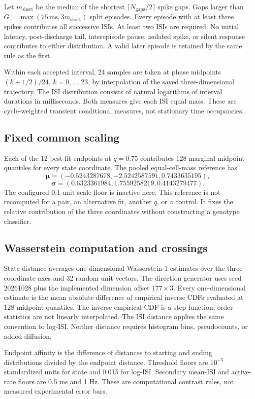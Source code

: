 \documentclass[11pt,a4paper]{article}
\begin{document}
Let $m_{\mathrm{short}}$ be the median of the shortest $\lceil N_{\mathrm{gaps}}/2\rceil$ spike gaps. Gaps larger than $G=\max(75\,\mathrm{ms},3m_{\mathrm{short}})$ split episodes. Every episode with at least three spikes contributes all successive ISIs. At least two ISIs are required. No initial latency, post-discharge tail, interepisode pause, isolated spike, or silent response contributes to either distribution. A valid later episode is retained by the same rule as the first.

Within each accepted interval, 24 samples are taken at phase midpoints $(k+1/2)/24$, $k=0,\ldots,23$, by interpolation of the saved three-dimensional trajectory. The ISI distribution consists of natural logarithms of interval durations in milliseconds. Both measures give each ISI equal mass. These are cycle-weighted transient conditional measures, not stationary time occupancies.

\subsection*{Fixed common scaling}
Each of the 12 best-fit endpoints at $q=0.75$ contributes 128 marginal midpoint quantiles for every state coordinate. The pooled equal-cell-mass reference has
\[\boldsymbol\mu=(-0.5243287678,-2.5242587591,0.7433635195),\]
\[\boldsymbol\sigma=(0.6323361984,1.7559258219,0.4143279477).\]
The configured 0.1-unit scale floor is inactive here. This reference is not recomputed for a pair, an alternative fit, another $q$, or a control. It fixes the relative contribution of the three coordinates without constructing a genotype classifier.

\subsection*{Wasserstein computation and crossings}
State distance averages one-dimensional Wasserstein-1 estimates over the three coordinate axes and 32 random unit vectors. The direction generator uses seed 20261028 plus the implemented dimension offset $177\times3$. Every one-dimensional estimate is the mean absolute difference of empirical inverse CDFs evaluated at 128 midpoint quantiles. The inverse empirical CDF is a step function; order statistics are not linearly interpolated. The ISI distance applies the same convention to log-ISI. Neither distance requires histogram bins, pseudocounts, or added diffusion.

Endpoint affinity is the difference of distances to starting and ending distributions divided by the endpoint distance. Threshold floors are $10^{-5}$ standardized units for state and 0.015 for log-ISI. Secondary mean-ISI and active-rate floors are 0.5 ms and 1 Hz. These are computational contrast rules, not measured experimental error bars.
\end{document}
